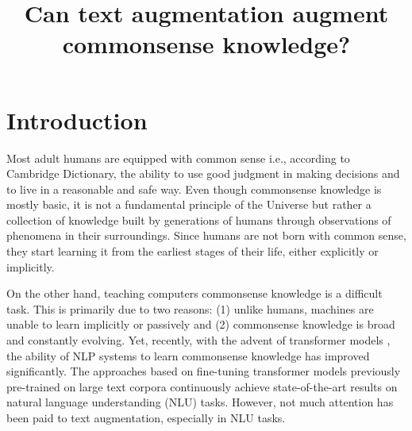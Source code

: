 \documentclass[10pt, a4paper]{article}
\title{Can text augmentation augment commonsense knowledge?}
\begin{document}
\maketitleabstract

\section{Introduction}
Most adult humans are equipped with common sense i.e., according to Cambridge Dictionary, the ability to use good judgment in making decisions and to live in a reasonable and safe way. Even though commonsense knowledge is mostly basic, it is not a fundamental principle of the Universe but rather a collection of knowledge built by generations of humans through observations of phenomena in their surroundings. Since humans are not born with common sense, they start learning it from the earliest stages of their life, either explicitly or implicitly.

On the other hand, teaching computers commonsense knowledge is a difficult task. This is primarily due to two reasons: (1) unlike humans, machines are unable to learn implicitly or passively and (2) commonsense knowledge is broad and constantly evolving. Yet, recently, with the advent of transformer models \citep{transformers}, the ability of NLP systems to learn commonsense knowledge has improved significantly. The approaches based on fine-tuning transformer models previously pre-trained on large text corpora continuously achieve state-of-the-art results on natural language understanding (NLU) tasks. However, not much attention has been paid to text augmentation, especially in NLU tasks.

\end{document}
